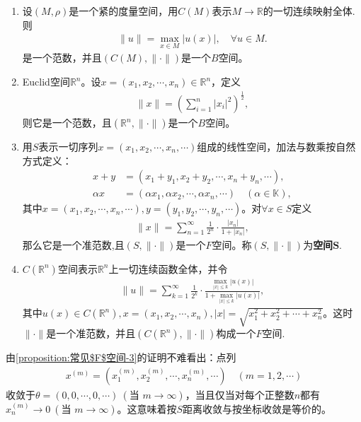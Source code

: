 \documentclass[../../main.tex]{subfiles}%
\begin{document}
\begin{proposition}\label{proposition:常见F空间}
\begin{enumerate}[(1)]
\item\label{proposition:常见F空间-1} 设$(M,\rho)$是一个紧的度量空间，用$C(M)$表示$M\to\mathbb{R}$的一切连续映射全体.则
\begin{align*}
\|u\|=\max_{x\in M}|u(x)|,\quad \forall u\in M.
\end{align*}
是一个范数，并且$(C(M),\|\cdot\|)$是一个$B$空间。

\item Euclid空间$\mathbb{R}^n$。设$x=(x_1,x_2,\cdots,x_n)\in\mathbb{R}^n$，定义
\begin{align*}
\|x\|=\left(\sum_{i=1}^n|x_i|^2\right)^{\frac{1}{2}},
\end{align*}
则它是一个范数，且$(\mathbb{R}^n,\|\cdot\|)$是一个$B$空间。

\item\label{proposition:常见$F$空间-3} 用$S$表示一切序列$x=(x_1,x_2,\cdots,x_n,\cdots)$组成的线性空间，加法与数乘按自然方式定义：
\begin{align*}
x+y&=(x_1+y_1,x_2+y_2,\cdots,x_n+y_n,\cdots),\\
\alpha x&=(\alpha x_1,\alpha x_2,\cdots,\alpha x_n,\cdots)\quad(\alpha\in\mathbb{K}),
\end{align*}
其中$x=(x_1,x_2,\cdots,x_n,\cdots),y=(y_1,y_2,\cdots,y_n,\cdots)$。对$\forall x\in S$定义
\begin{align*}
\|x\|=\sum_{n=1}^\infty\frac{1}{2^n}\cdot\frac{|x_n|}{1+|x_n|},
\end{align*}
那么它是一个准范数,且$(S,\|\cdot\|)$是一个$F$空间。称$(S,\|\cdot\|)$为\textbf{空间}$\bm{S}$.

\item $C(\mathbb{R}^n)$空间表示$\mathbb{R}^n$上一切连续函数全体，并令
\begin{align*}
\parallel u\parallel =\sum_{k=1}^{\infty}{\frac{1}{2^k}}\cdot \frac{\max\limits_{|x|\leqslant k} |u(x)|}{1+\max\limits_{|x|\leqslant k} |u(x)|},
\end{align*}
其中$u(x)\in C(\mathbb{R}^n),x=(x_1,x_2,\cdots,x_n),|x|=\sqrt{x_1^2+x_2^2+\cdots+x_n^2}$。这时$\|\cdot\|$是一个准范数，并且$(C(\mathbb{R}^n),\|\cdot\|)$构成一个$F$空间.
\end{enumerate}
\end{proposition}
\begin{remark}
由\ref{proposition:常见$F$空间-3}的证明不难看出：点列
\begin{align*}
x^{(m)}=(x_1^{(m)},x_2^{(m)},\cdots,x_n^{(m)},\cdots)\quad(m=1,2,\cdots)
\end{align*}
收敛于$\theta=(0,0,\cdots,0,\cdots)\ (\text{当 }m\to\infty)$，当且仅当对每个正整数$n$都有$x_n^{(m)}\to0\ (\text{当 }m\to\infty)$。这意味着按$S$距离收敛与按坐标收敛是等价的。
\end{remark}
\end{document}
